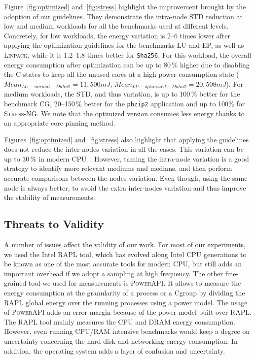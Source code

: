 Figure~\ref{fig:optimized} and~\ref{fig:stress} highlight the improvement brought by the adoption of our guidelines.
They demonstrate the intra-node STD reduction at low and medium workloads for all the benchmarks used at different levels.
Concretely, for low workloads, the energy variation is 2--6 times lower after applying the optimization guidelines for the benchmarks \textsf{LU} and \textsf{EP}, as well as \textsc{Linpack}, while it is 1.2--1.8 times better for \texttt{Sha256}.
For this workload, the overall energy consumption after optimization can be up to 80\,\% higher due to disabling the C-states to keep all the unused cores at a high power consumption state ($Mean_{LU-normal-Dahu2}=11,500 mJ$, $Mean_{LU-optimized-Dahu2}=20,508 mJ$).
For medium workloads, the STD, and thus variation, is up to 100\,\% better for the benchmark \textsf{CG}, 20--150\,\% better for the \texttt{pbzip2} application and up to 100\% for \textsc{Stress-NG}.
We note that the optimized version consumes less energy thanks to an appropriate core pinning method.

Figures~\ref{fig:optimized} and~\ref{fig:stress} also highlight that applying the guidelines does not reduce the inter-nodes variation in all the cases.
This variation can be up to 30\,\% in modern CPU~\cite{wang_experimental_nodate}.
However, taming the intra-node variation is a good strategy to identify more relevant mediums and medians, and then perform accurate comparisons between the nodes variation.
Even though, using the same node is always better, to avoid the extra inter-nodes variation and thus improve the stability of measurements.


\subsection{Threats to Validity}
A number of issues affect the validity of our work.
For most of our experiments, we used the Intel RAPL tool, which has evolved along Intel CPU generations to be known as one of the most accurate tools for modern CPU, but still adds an important overhead if we adopt a sampling at high frequency.
The other fine-grained tool we used for measurements is \textsc{PowerAPI}.
It allows to measure the energy consumption at the granularity of a process or a Cgroup by dividing the RAPL global energy over the running processes using a power model.
The usage of \textsc{PowerAPI} adds an error margin because of the power model built over RAPL.
The RAPL tool mainly measures the CPU and DRAM energy consumption.
However, even running CPU/RAM intensive benchmarks would keep a degree on uncertainty concerning the hard disk and networking energy consumption.
In addition, the operating system adds a layer of confusion and uncertainty.

